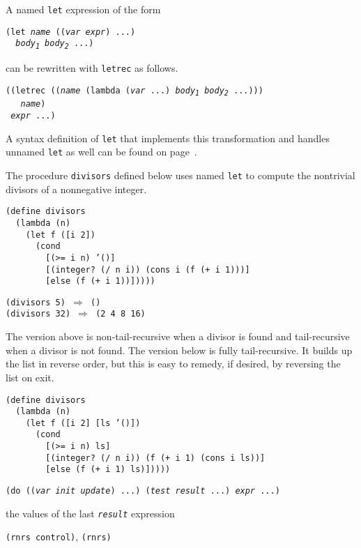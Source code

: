 A named \texttt{let} expression of the form


\begin{alltt}
(let \textit{name} ((\textit{var} \textit{expr}) ...)
  \textit{body\textsubscript{1}} \textit{body\textsubscript{2}} ...)
\end{alltt}


can be rewritten with \texttt{letrec} as follows.


\begin{alltt}
((letrec ((\textit{name} (lambda (\textit{var} ...) \textit{body\textsubscript{1}} \textit{body\textsubscript{2}} ...)))
   \textit{name})
 \textit{expr} ...)
\end{alltt}


A syntax definition of \texttt{let} that implements this transformation
and handles unnamed \texttt{let} as well
can be found on page \pageref{syntax_defn_let}.



The procedure \label{control_s24}\texttt{divisors} defined below uses named \texttt{let} to compute the
nontrivial divisors of a nonnegative integer.


\begin{alltt}
(define divisors
  (lambda (n)
    (let f ([i 2])
      (cond
        [(\textgreater{}= i n) '()]
        [(integer? (/ n i)) (cons i (f (+ i 1)))]
        [else (f (+ i 1))]))))

(divisors 5) \(\Rightarrow\) ()
(divisors 32) \(\Rightarrow\) (2 4 8 16)
\end{alltt}


The version above is non-tail-recursive when a divisor is found and
tail-recursive when a divisor is not found.
The version below is fully tail-recursive.
It builds up the list in reverse order, but this is easy to remedy,
if desired, by reversing the list on exit.


\begin{alltt}
(define divisors
  (lambda (n)
    (let f ([i 2] [ls '()])
      (cond
        [(\textgreater{}= i n) ls]
        [(integer? (/ n i)) (f (+ i 1) (cons i ls))]
        [else (f (+ i 1) ls)]))))
\end{alltt}

\begin{description}

\label{control_s25}\item[syntax] \texttt{(do ((\textit{var} \textit{init} \textit{update}) ...) (\textit{test} \textit{result} ...) \textit{expr} ...)}



\item[returns] the values of the last \texttt{\textit{result}} expression


\item[libraries] \texttt{(rnrs control)}, \texttt{(rnrs)}
\end{description}

